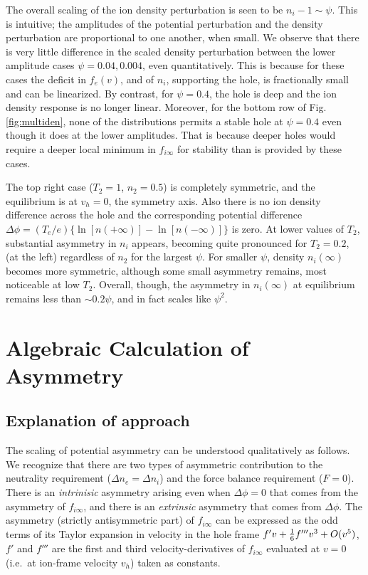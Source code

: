\documentclass[pre]{revtex4-2}
\begin{document}
The overall scaling of the ion density perturbation is seen to be
$n_i-1\sim \psi$. This is intuitive; the amplitudes of the potential
perturbation and the density perturbation are proportional to one
another, when small.  We observe that there is very little difference
in the scaled density perturbation between the lower amplitude cases
$\psi=0.04,0.004$, even quantitatively. This is because for these
cases the deficit in $f_e(v)$, and of $n_i$, supporting the hole, is
fractionally small and can be linearized. By contrast, for $\psi=0.4$,
the hole is deep and the ion density response is no longer
linear. Moreover, for the bottom row of Fig. \ref{fig:multiden}, none
of the distributions permits a stable hole at $\psi=0.4$ even though
it does at the lower amplitudes. That is because deeper holes would
require a deeper local minimum in $f_{i\infty}$ for stability than is
provided by these cases.

The top right case ($T_{2}=1$, $n_2=0.5$) is completely symmetric, and
the equilibrium is at $v_h=0$, the symmetry axis. Also there is no ion
density difference across the hole and the corresponding potential
difference $\Delta\phi=(T_e/e)\{\ln[n(+\infty)]-\ln[n(-\infty)]\}$ is
zero. At lower values of $T_2$, substantial asymmetry in $n_i$
appears, becoming quite pronounced for $T_2=0.2$, (at the left)
regardless of $n_2$ for the largest $\psi$. For smaller $\psi$,
density $n_i(\infty)$ becomes more symmetric, although some small
asymmetry remains, most noticeable at low $T_2$. Overall, though, the
asymmetry in $n_i(\infty)$ at equilibrium remains less than
$\sim 0.2\psi$, and in fact scales like $\psi^2$.

\section{Algebraic Calculation of Asymmetry}
\label{SectionAlgebra}

\subsection{Explanation of approach}
The scaling of potential asymmetry can be understood qualitatively as
follows. We recognize that there are two types of asymmetric
contribution to the neutrality requirement ($\Delta n_e=\Delta n_i$)
and the force balance requirement ($F=0$). There is an
\emph{intrinisic} asymmetry arising even when $\Delta\phi=0$ that
comes from the asymmetry of $f_{i\infty}$, and there is an
\emph{extrinsic} asymmetry that comes from $\Delta \phi$.  The
asymmetry (strictly antisymmetric part) of $f_{i\infty}$ can be
expressed as the odd terms of its Taylor expansion in velocity in the
hole frame $f'v+{1\over6}f'''v^3+O(v^5)$, $f'$ and $f'''$ are the
first and third velocity-derivatives of $f_{i\infty}$ evaluated at
$v=0$ (i.e.\ at ion-frame velocity $v_h$) taken as constants.
\end{document}
